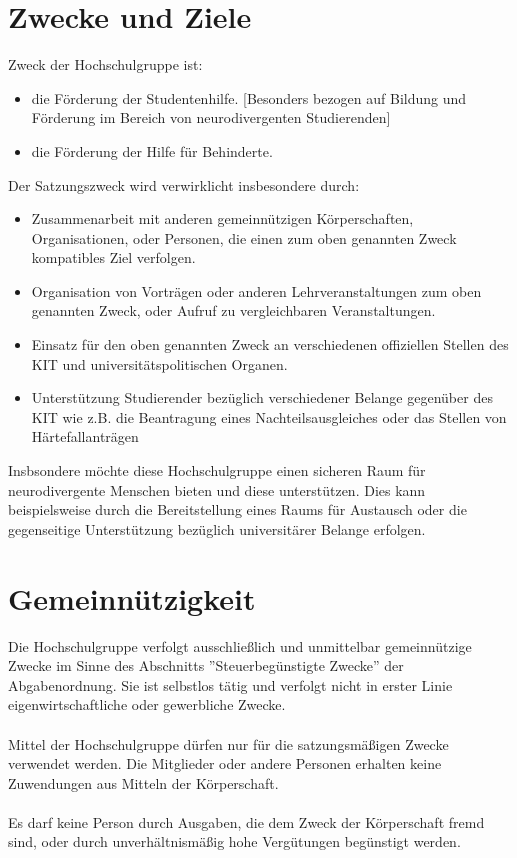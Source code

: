\documentclass[11pt]{article}
\begin{document}
\section{Zwecke und Ziele}
\label{zweck}
Zweck der Hochschulgruppe ist:
\begin{itemize}
	\item die Förderung der Studentenhilfe. [Besonders bezogen auf Bildung und Förderung im Bereich von neurodivergenten Studierenden]
	\item die Förderung der Hilfe für Behinderte.
\end{itemize}
Der Satzungszweck wird verwirklicht insbesondere durch:
\begin{itemize}
	\item Zusammenarbeit mit anderen gemeinnützigen Körperschaften, Organisationen, oder Personen, die einen zum oben genannten Zweck kompatibles Ziel verfolgen.
	\item Organisation von Vorträgen oder anderen Lehrveranstaltungen zum oben genannten Zweck, oder Aufruf zu vergleichbaren Veranstaltungen.
	\item Einsatz für den oben genannten Zweck an verschiedenen offiziellen Stellen des KIT und universitätspolitischen Organen.
	\item Unterstützung Studierender bezüglich verschiedener Belange gegenüber des KIT wie z.B. die Beantragung eines Nachteilsausgleiches oder das Stellen von Härtefallanträgen
\end{itemize}
Insbsondere möchte diese Hochschulgruppe einen sicheren Raum für neurodivergente Menschen bieten und diese unterstützen. Dies kann beispielsweise durch die Bereitstellung eines Raums für Austausch oder die gegenseitige Unterstützung bezüglich universitärer Belange erfolgen.

\section{Gemeinnützigkeit}
Die Hochschulgruppe verfolgt ausschließlich und unmittelbar gemeinnützige Zwecke im Sinne
des Abschnitts ''Steuerbegünstigte Zwecke'' der Abgabenordnung. Sie ist selbstlos tätig und verfolgt
nicht in erster Linie eigenwirtschaftliche oder gewerbliche Zwecke.\\\\
Mittel der Hochschulgruppe dürfen nur für die satzungsmäßigen Zwecke verwendet werden. Die
Mitglieder oder andere Personen erhalten keine Zuwendungen aus Mitteln der Körperschaft.\\\\
Es darf keine Person durch Ausgaben, die dem Zweck der Körperschaft fremd sind, oder durch
unverhältnismäßig hohe Vergütungen begünstigt werden.
\end{document}
